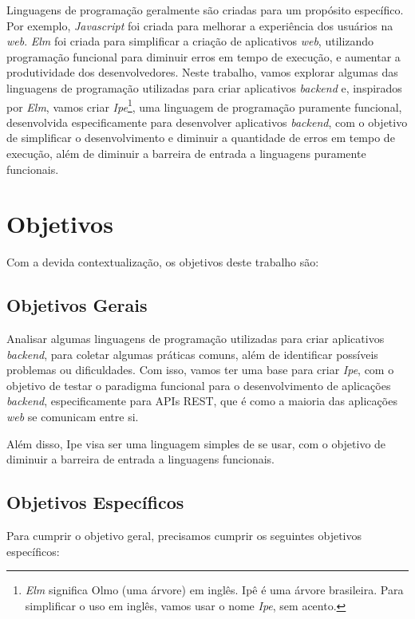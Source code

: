Linguagens de programação geralmente são criadas para um propósito específico. Por
exemplo, \textit{Javascript} foi criada para melhorar a experiência dos usuários
na \textit{web}. \textit{Elm} foi criada para simplificar a criação de aplicativos
\textit{web}, utilizando programação funcional para diminuir erros em tempo de
execução, e aumentar a produtividade dos desenvolvedores. Neste trabalho, vamos
explorar algumas das linguagens de programação utilizadas para criar aplicativos
\textit{backend} e, inspirados por \textit{Elm}, vamos criar
\textit{Ipe}\footnote{\textit{Elm} significa Olmo (uma árvore) em inglês. Ipê é uma árvore brasileira. Para simplificar o uso em inglês, vamos usar o nome \textit{Ipe}, sem acento.},
uma linguagem de programação puramente funcional, desenvolvida especificamente para
desenvolver aplicativos \textit{backend}, com o objetivo de simplificar o desenvolvimento
e diminuir a quantidade de erros em tempo de execução, além de diminuir a barreira
de entrada a linguagens puramente funcionais.

\section{Objetivos}\label{sec:objectives}

Com a devida contextualização, os objetivos deste trabalho são:

\subsection{Objetivos Gerais}

Analisar algumas linguagens de programação utilizadas para criar aplicativos
\textit{backend}, para coletar algumas práticas comuns, além de identificar
possíveis problemas ou dificuldades. Com isso, vamos ter uma base
para criar \textit{Ipe}, com o objetivo de testar o paradigma funcional para o
desenvolvimento de aplicações \textit{backend}, especificamente para APIs REST,
que é como a maioria das aplicações \textit{web} se comunicam entre si.

Além disso, Ipe visa ser uma linguagem simples de se usar, com o objetivo de
diminuir a barreira de entrada a linguagens funcionais.

\subsection{Objetivos Específicos}

Para cumprir o objetivo geral, precisamos cumprir os seguintes objetivos específicos:

